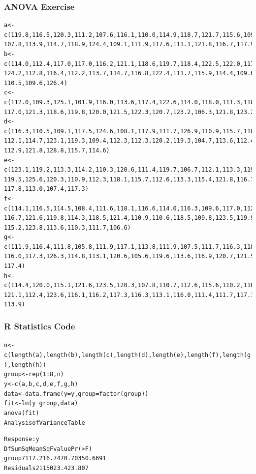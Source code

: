 \documentclass[xcolor=dvipsnames]{beamer}
\begin{document}
\begin{frame}[fragile]
  \frametitle{ANOVA Exercise}
  \begin{scriptsize}
\begin{verbatim}
a<-c(119.8,116.5,120.3,111.2,107.6,116.1,110.0,114.9,118.7,121.7,115.6,109.4,
107.8,113.9,114.7,118.9,124.4,109.1,111.9,117.6,111.1,121.8,116.7,117.9,117.9)
b<-c(114.0,112.4,117.0,117.0,116.2,121.1,118.6,119.7,118.4,122.5,122.0,117.8,
124.2,112.8,116.4,112.2,113.7,114.7,116.8,122.4,111.7,115.9,114.4,109.6,123.2,
110.5,109.6,126.4)
c<-c(112.0,109.3,125.1,101.9,116.0,113.6,117.4,122.6,114.0,118.0,111.3,118.4,
117.0,121.3,118.6,119.8,120.0,121.5,122.3,120.7,123.2,106.3,121.8,123.2)
d<-c(116.3,110.5,109.1,117.5,124.6,108.1,117.9,111.7,126.9,110.9,115.7,110.8,
112.1,114.7,123.1,119.3,109.4,112.3,112.3,120.2,119.3,104.7,113.6,112.4,115.2,
112.9,121.8,128.8,115.7,114.6)
e<-c(123.1,119.2,113.3,114.2,110.3,120.6,111.4,119.7,106.7,112.1,113.3,119.3,
119.5,125.6,120.3,110.9,112.3,118.1,115.7,112.6,113.3,115.4,121.8,116.7,109.1,
117.8,113.0,107.4,117.3)
f<-c(114.1,116.5,114.5,108.4,111.6,118.1,116.6,114.0,116.3,109.6,117.0,112.0,
116.7,121.6,119.8,114.3,118.5,121.4,110.9,110.6,118.5,109.8,123.5,119.9,114.1,
115.2,123.8,113.6,110.3,111.7,106.6)
g<-c(111.9,116.4,111.8,105.8,111.9,117.1,113.8,111.9,107.5,111.7,116.3,118.4,
116.0,117.3,126.3,114.8,113.1,120.6,105.6,119.6,113.6,116.9,120.7,121.5,117.1,
117.4)
h<-c(114.4,120.0,115.1,121.6,123.5,120.3,107.8,110.7,112.6,115.6,110.2,116.3,
121.1,112.4,123.6,116.1,116.2,117.3,116.3,113.1,116.0,111.4,111.7,117.1,116.2,
113.9)
\end{verbatim}
  \end{scriptsize}
\end{frame}

\begin{frame}
  \frametitle{R Statistics Code}
\begin{scriptsize}
\begin{alltt}
n<-c(length(a),length(b),length(c),length(d),length(e),length(f),length(g),length(h))
group<-rep(1:8,n)
y<-c(a,b,c,d,e,f,g,h)
data<-data.frame(y=y,group=factor(group))
fit<-lm(y~group,data)
anova(fit)
Analysis of Variance Table

Response: y
           Df Sum Sq Mean Sq F value Pr(>F)
group       7  117.2  16.747  0.7035 0.6691
Residuals 211 5023.4  23.807 
\end{alltt}
\end{scriptsize}
\end{frame}
\end{document}
